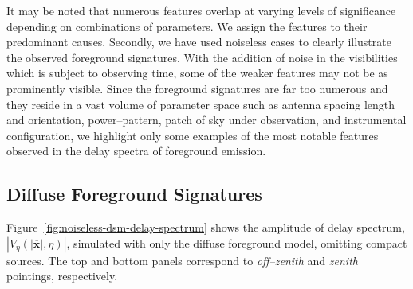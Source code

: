 \documentclass[preprint2,iop,numberedappendix]{emulateapj}
\begin{document}
\begin{itemize}

\end{itemize}

It may be noted that numerous features overlap at varying levels of significance depending on combinations of parameters. We assign the features to their predominant causes. Secondly, we have used noiseless cases to clearly illustrate the observed foreground signatures. With the addition of noise in the visibilities which is subject to observing time, some of the weaker features may not be as prominently visible. Since the foreground signatures are far too numerous and they reside in a vast volume of parameter space such as antenna spacing length and orientation, power--pattern, patch of sky under observation, and instrumental configuration, we highlight only some examples of the most notable features observed in the delay spectra of foreground emission.

\subsection{Diffuse Foreground Signatures}\label{sec:diffuse}

Figure~\ref{fig:noiseless-dsm-delay-spectrum} shows the amplitude of delay spectrum, $|V_\eta(|\overline{\mathbf{x}}|,\eta)|$, simulated with only the diffuse foreground model, omitting compact sources. The top and bottom panels correspond to {\it off--zenith} and {\it zenith} pointings, respectively. 
\end{document}
